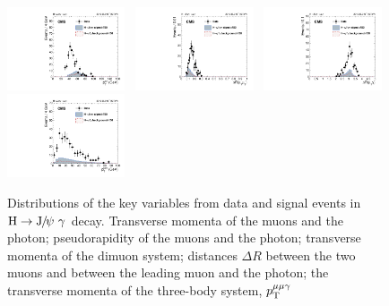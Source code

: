 \begin{figure}[h]
		  \includegraphics[width=0.31\textwidth]{Fig/Final_NoPreliminary/HJpsiG/pTmumu_Inclusive}~
		  \includegraphics[width=0.31\textwidth]{Fig/Final_NoPreliminary/HJpsiG/delR_Muons_Inclusive}~
		  \includegraphics[width=0.31\textwidth]{Fig/Final_NoPreliminary/HJpsiG/delR_leMuPho_Inclusive}\\
		  \includegraphics[width=0.31\textwidth]{Fig/Final_NoPreliminary/HJpsiG/pTmmg_Inclusive}\\
		
		  \caption{Distributions of the key variables from data and signal events in $\mathrm{H}\to{\mathrm{J}\hspace{-.08em}/\hspace{-.14em}\psi}\ \gamma$ decay. Transverse momenta of the muons and the photon;  pseudorapidity of the muons and the photon; transverse momenta of the dimuon system; distances $\Delta R$ between the two muons and between the leading muon and the photon; the transverse momenta of the three-body system, $p_{\mathrm{T}}^{\mu\mu\gamma}$}
		  \label{fig:dist-3}
		\end{figure}
		\clearpage
		
